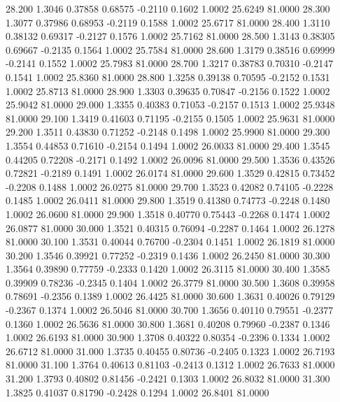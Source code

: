   28.200   1.3046   0.37858   0.68575  -0.2110   0.1602   1.0002  25.6249  81.0000
  28.300   1.3077   0.37986   0.68953  -0.2119   0.1588   1.0002  25.6717  81.0000
  28.400   1.3110   0.38132   0.69317  -0.2127   0.1576   1.0002  25.7162  81.0000
  28.500   1.3143   0.38305   0.69667  -0.2135   0.1564   1.0002  25.7584  81.0000
  28.600   1.3179   0.38516   0.69999  -0.2141   0.1552   1.0002  25.7983  81.0000
  28.700   1.3217   0.38783   0.70310  -0.2147   0.1541   1.0002  25.8360  81.0000
  28.800   1.3258   0.39138   0.70595  -0.2152   0.1531   1.0002  25.8713  81.0000
  28.900   1.3303   0.39635   0.70847  -0.2156   0.1522   1.0002  25.9042  81.0000
  29.000   1.3355   0.40383   0.71053  -0.2157   0.1513   1.0002  25.9348  81.0000
  29.100   1.3419   0.41603   0.71195  -0.2155   0.1505   1.0002  25.9631  81.0000
  29.200   1.3511   0.43830   0.71252  -0.2148   0.1498   1.0002  25.9900  81.0000
  29.300   1.3554   0.44853   0.71610  -0.2154   0.1494   1.0002  26.0033  81.0000
  29.400   1.3545   0.44205   0.72208  -0.2171   0.1492   1.0002  26.0096  81.0000
  29.500   1.3536   0.43526   0.72821  -0.2189   0.1491   1.0002  26.0174  81.0000
  29.600   1.3529   0.42815   0.73452  -0.2208   0.1488   1.0002  26.0275  81.0000
  29.700   1.3523   0.42082   0.74105  -0.2228   0.1485   1.0002  26.0411  81.0000
  29.800   1.3519   0.41380   0.74773  -0.2248   0.1480   1.0002  26.0600  81.0000
  29.900   1.3518   0.40770   0.75443  -0.2268   0.1474   1.0002  26.0877  81.0000
  30.000   1.3521   0.40315   0.76094  -0.2287   0.1464   1.0002  26.1278  81.0000
  30.100   1.3531   0.40044   0.76700  -0.2304   0.1451   1.0002  26.1819  81.0000
  30.200   1.3546   0.39921   0.77252  -0.2319   0.1436   1.0002  26.2450  81.0000
  30.300   1.3564   0.39890   0.77759  -0.2333   0.1420   1.0002  26.3115  81.0000
  30.400   1.3585   0.39909   0.78236  -0.2345   0.1404   1.0002  26.3779  81.0000
  30.500   1.3608   0.39958   0.78691  -0.2356   0.1389   1.0002  26.4425  81.0000
  30.600   1.3631   0.40026   0.79129  -0.2367   0.1374   1.0002  26.5046  81.0000
  30.700   1.3656   0.40110   0.79551  -0.2377   0.1360   1.0002  26.5636  81.0000
  30.800   1.3681   0.40208   0.79960  -0.2387   0.1346   1.0002  26.6193  81.0000
  30.900   1.3708   0.40322   0.80354  -0.2396   0.1334   1.0002  26.6712  81.0000
  31.000   1.3735   0.40455   0.80736  -0.2405   0.1323   1.0002  26.7193  81.0000
  31.100   1.3764   0.40613   0.81103  -0.2413   0.1312   1.0002  26.7633  81.0000
  31.200   1.3793   0.40802   0.81456  -0.2421   0.1303   1.0002  26.8032  81.0000
  31.300   1.3825   0.41037   0.81790  -0.2428   0.1294   1.0002  26.8401  81.0000
